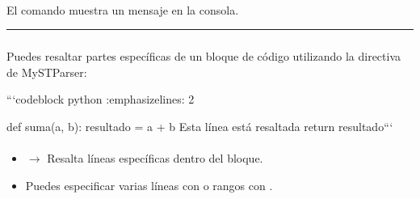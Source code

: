 \documentclass[a4paper,10pt,oneside,spanish,openany]{sphinxmanual}
\begin{document}
\sphinxAtStartPar
{}\\
El comando  muestra un mensaje en la consola.


\bigskip\hrule\bigskip



\subsubsection{}
\label{\detokenize{configuracion_inicial/013.guia_de_myst_parser:resaltar-fragmentos-de-codigo-highlighting}}
\sphinxAtStartPar
Puedes resaltar partes específicas de un bloque de código utilizando la directiva  de MyST\sphinxhyphen{}Parser:

\begin{sphinxVerbatim}[commandchars=\\\{\}]
	```\PYGZob{}code\PYGZhy{}block\PYGZcb{} python
	:emphasize\PYGZhy{}lines: 2

	def suma(a, b):
	 resultado = a + b  \PYGZsh{} Esta línea está resaltada
	 return resultado```
\end{sphinxVerbatim}

\sphinxAtStartPar
{}

%
\begin{sphinxVerbatim}[commandchars=\\\{\}]
    
     
   
\end{sphinxVerbatim}
\sphinxresetverbatimhllines


\paragraph{}
\label{\detokenize{configuracion_inicial/013.guia_de_myst_parser:id5}}\begin{itemize}
\item {} 
\sphinxAtStartPar
{} \(\rightarrow\) Resalta líneas específicas dentro del bloque.

\item {} 
\sphinxAtStartPar
Puedes especificar varias líneas con  o rangos con .

\end{itemize}
\end{document}
